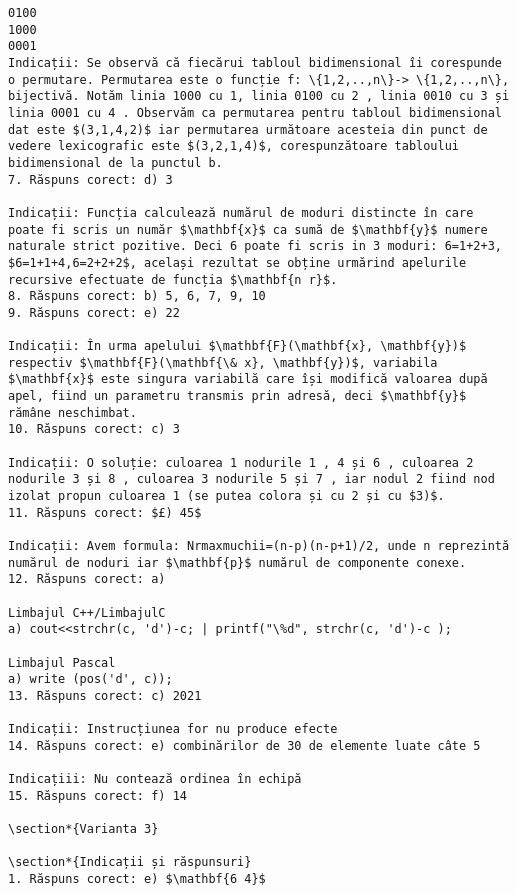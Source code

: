 \begin{verbatim}
0100
1000
0001
Indicații: Se observă că fiecărui tabloul bidimensional îi corespunde o permutare. Permutarea este o funcție f: \{1,2,..,n\}-> \{1,2,..,n\}, bijectivă. Notăm linia 1000 cu 1, linia 0100 cu 2 , linia 0010 cu 3 și linia 0001 cu 4 . Observăm ca permutarea pentru tabloul bidimensional dat este $(3,1,4,2)$ iar permutarea următoare acesteia din punct de vedere lexicografic este $(3,2,1,4)$, corespunzătoare tabloului bidimensional de la punctul b.
7. Răspuns corect: d) 3

Indicații: Funcția calculează numărul de moduri distincte în care poate fi scris un număr $\mathbf{x}$ ca sumă de $\mathbf{y}$ numere naturale strict pozitive. Deci 6 poate fi scris in 3 moduri: 6=1+2+3, $6=1+1+4,6=2+2+2$, același rezultat se obține urmărind apelurile recursive efectuate de funcția $\mathbf{n r}$.
8. Răspuns corect: b) 5, 6, 7, 9, 10
9. Răspuns corect: e) 22

Indicații: În urma apelului $\mathbf{F}(\mathbf{x}, \mathbf{y})$ respectiv $\mathbf{F}(\mathbf{\& x}, \mathbf{y})$, variabila $\mathbf{x}$ este singura variabilă care își modifică valoarea după apel, fiind un parametru transmis prin adresă, deci $\mathbf{y}$ rămâne neschimbat.
10. Răspuns corect: c) 3

Indicații: O soluție: culoarea 1 nodurile 1 , 4 și 6 , culoarea 2 nodurile 3 și 8 , culoarea 3 nodurile 5 și 7 , iar nodul 2 fiind nod izolat propun culoarea 1 (se putea colora și cu 2 și cu $3)$.
11. Răspuns corect: $£) 45$

Indicații: Avem formula: Nrmaxmuchii=(n-p)(n-p+1)/2, unde n reprezintă numărul de noduri iar $\mathbf{p}$ numărul de componente conexe.
12. Răspuns corect: a)

Limbajul C++/LimbajulC
a) cout<<strchr(c, 'd')-c; | printf("\%d", strchr(c, 'd')-c );

Limbajul Pascal
a) write (pos('d', c));
13. Răspuns corect: c) 2021

Indicații: Instrucțiunea for nu produce efecte
14. Răspuns corect: e) combinărilor de 30 de elemente luate câte 5

Indicațiii: Nu contează ordinea în echipă
15. Răspuns corect: f) 14

\section*{Varianta 3}

\section*{Indicații și răspunsuri}
1. Răspuns corect: e) $\mathbf{6 4}$


\end{verbatim}
